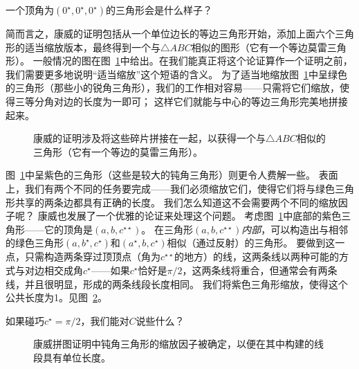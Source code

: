 \begin{exer}
一个顶角为$(0^\star, 0^\star, 0^\star)$的三角形会是什么样子？
\end{exer}

简而言之，康威的证明包括从一个单位边长的等边三角形开始，添加上面六个三角形的适当缩放版本，最终得到一个与${\triangle}ABC$相似的图形（它有一个等边莫雷三角形）。
一般情况的图在图~\ref{fig:morley_conway_puzzle}中给出。在我们能真正将这个论证算作一个证明之前，我们需要更多地说明“适当缩放”这个短语的含义。
为了适当地缩放图~\ref{fig:morley_conway_puzzle}中呈绿色的三角形（那些小的锐角三角形），我们的工作相对容易——只需将它们缩放，使得三等分角对边的长度为一即可；
这样它们就能与中心的等边三角形完美地拼接起来。

\begin{figure}[!hbtp] 
\begin{center}

\end{center}
\caption[康威的拼图证明。]{康威的证明涉及将这些碎片拼接在一起，以获得一个与${\triangle}ABC$相似的三角形（它有一个等边的莫雷三角形）。}
\label{fig:morley_conway_puzzle}
\end{figure}

图~\ref{fig:morley_conway_puzzle}中呈紫色的三角形（这些是较大的钝角三角形）则更令人费解一些。
表面上，我们有两个不同的任务要完成——我们必须缩放它们，使得它们将与绿色三角形共享的两条边都具有正确的长度。
我们怎么知道这不会需要两个不同的缩放因子呢？
康威也发展了一个优雅的论证来处理这个问题。
考虑图~\ref{fig:morley_conway_puzzle}中底部的紫色三角形——它的顶角是$(a,b,c^{\star\star})$。
在三角形$(a,b,c^{\star\star})$\emph{内部}，可以构造出与相邻的绿色三角形$(a, b^\star, c^\star)$和$(a^\star, b, c^\star)$相似（通过反射）的三角形。
要做到这一点，只需构造两条穿过顶顶点（角为$c^{\star\star}$的地方）的线，这两条线以两种可能的方式与对边相交成角$c^\star$——如果$c^\star$恰好是$\pi/2$，这两条线将重合，但通常会有两条线，并且很明显，形成的两条线段长度相同。
我们将紫色三角形缩放，使得这个公共长度为1。见图~\ref{fig:morley_conway_puzzle_scaling}。

\begin{exer}
如果碰巧$c^\star = \pi/2$，我们能对$C$说些什么？
\end{exer}

\begin{figure}[!hbtp] 
\begin{center}

\end{center}
\caption[康威拼图证明中的缩放。]{康威拼图证明中钝角三角形的缩放因子被确定，以便在其中构建的线段具有单位长度。}
\label{fig:morley_conway_puzzle_scaling}
\end{figure}
 

